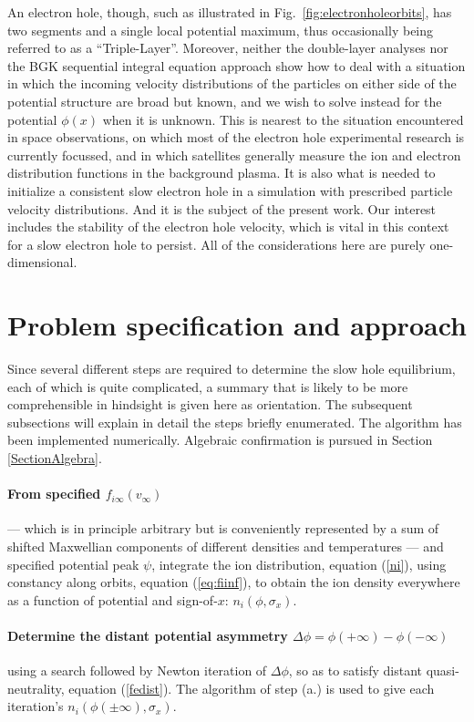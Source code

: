 \documentclass[pre]{revtex4-2}
\begin{document}
An electron hole, though, such as illustrated in Fig.\
\ref{fig:electronholeorbits}, has two segments and a single local
potential maximum, thus occasionally being referred to as a
``Triple-Layer''. Moreover, neither the double-layer analyses nor the
BGK sequential integral equation approach show how to deal with a
situation in which the incoming velocity distributions of the
particles on either side of the potential structure are broad but
known, and we wish to solve instead for the potential $\phi(x)$ when
it is unknown. This is nearest to the situation encountered in space
observations, on which most of the electron hole experimental research
is currently focussed, and in which satellites generally measure the
ion and electron distribution functions in the background plasma. It
is also what is needed to initialize a consistent slow electron hole
in a simulation with prescribed particle velocity distributions. And
it is the subject of the present work. Our interest includes the
stability of the electron hole velocity, which is vital in this
context for a slow electron hole to persist. All of the considerations
here are purely one-dimensional.

\section{Problem specification and  approach}

Since several different steps are required to determine the slow hole
equilibrium, each of which is quite complicated, a summary that is
likely to be more comprehensible in hindsight is given here as
orientation. The subsequent subsections will explain in detail
the steps briefly enumerated.  The algorithm has been
implemented numerically. Algebraic confirmation is pursued in
Section \ref{SectionAlgebra}.

\paragraph{From specified $f_{i\infty}(v_\infty)$} --- which is in
principle arbitrary but is conveniently represented by a sum of
shifted Maxwellian components of different densities and temperatures
--- and specified potential peak $\psi$, integrate the ion
distribution, equation (\ref{ni}), using constancy along orbits, equation
(\ref{eq:fiinf}), to obtain the ion density everywhere as a function of
potential and sign-of-$x$: $n_i(\phi,\sigma_x)$.

\paragraph{Determine the distant potential asymmetry
  $\Delta \phi = \phi(+\infty)-\phi(-\infty)$} using a search
followed by Newton iteration of $\Delta\phi$, so as to satisfy distant
quasi-neutrality, equation (\ref{fedist}). The algorithm of step (a.) is
used to give each iteration's $n_i(\phi(\pm\infty),\sigma_x)$.
\end{document}
